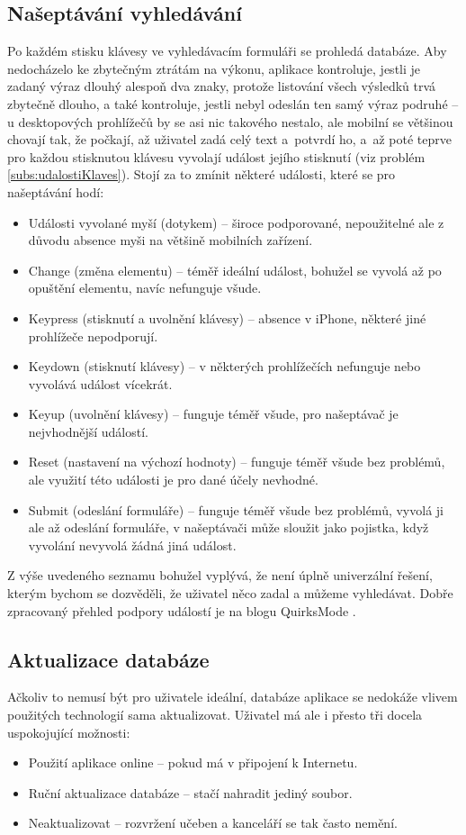 \subsection{Našeptávání vyhledávání}
Po každém stisku klávesy ve vyhledávacím formuláři se prohledá databáze. Aby nedocházelo ke zbytečným ztrátám na výkonu, aplikace kontroluje, jestli je zadaný výraz dlouhý alespoň dva znaky, protože listování všech výsledků trvá zbytečně dlouho, a také kontroluje, jestli nebyl odeslán ten samý výraz podruhé -- u desktopových prohlížečů by se asi nic takového nestalo, ale mobilní se většinou chovají tak, že počkají, až uživatel zadá celý text a~potvrdí ho, a~až poté teprve pro každou stisknutou klávesu vyvolají událost jejího stisknutí (viz problém \ref{subs:udalostiKlaves}). Stojí za to zmínit některé události, které se pro našeptávání hodí:
\begin{itemize}
\item Události vyvolané myší (dotykem) -- široce podporované, nepoužitelné ale z důvodu absence myši na většině mobilních zařízení.
\item Change (změna elementu) -- téměř ideální událost, bohužel se vyvolá až po opuštění elementu, navíc nefunguje všude.
\item Keypress (stisknutí a uvolnění klávesy) -- absence v iPhone, některé jiné prohlížeče nepodporují.
\item Keydown (stisknutí klávesy) -- v některých prohlížečích nefunguje nebo vyvolává událost vícekrát.
\item Keyup (uvolnění klávesy) -- funguje téměř všude, pro našeptávač je nejvhodnější událostí.
\item Reset (nastavení na výchozí hodnoty) -- funguje téměř všude bez problémů, ale využití této události je pro dané účely nevhodné.
\item Submit (odeslání formuláře) -- funguje téměř všude bez problémů, vyvolá ji ale až odeslání formuláře, v našeptávači může sloužit jako pojistka, když vyvolání nevyvolá žádná jiná událost.
\end{itemize}
Z výše uvedeného seznamu bohužel vyplývá, že není úplně univerzální řešení, kterým bychom se dozvěděli, že uživatel něco zadal a můžeme vyhledávat. Dobře zpracovaný přehled podpory událostí je na blogu QuirksMode \cite{EventCompatibility}.

\subsection{Aktualizace databáze}
Ačkoliv to nemusí být pro uživatele ideální, databáze aplikace se nedokáže vlivem použitých technologií sama aktualizovat. Uživatel má ale i přesto tři docela uspokojující možnosti:
\begin{itemize}
\item Použití aplikace online -- pokud má v připojení k Internetu.
\item Ruční aktualizace databáze -- stačí nahradit jediný soubor.
\item Neaktualizovat -- rozvržení učeben a kanceláří se tak často nemění.
\end{itemize}


